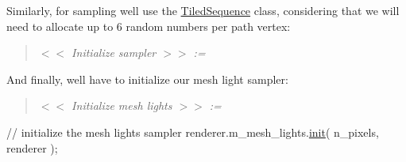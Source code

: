 \begin{DoxyParagraph}{}
Similarly, for sampling we\textquotesingle{}ll use the \hyperlink{struct_tiled_sequence}{Tiled\+Sequence} class, considering that we will need to allocate up to 6 random numbers per path vertex\+: ~\newline
\label{_hello_renderer_page_Initialize_sampler_anchor}%
%
 \begin{quote}
{\itshape  $<$$<$ Initialize sampler $>$$>$ \+:= }

\end{quote}


\end{DoxyParagraph}
\begin{DoxyParagraph}{}
And finally, we\textquotesingle{}ll have to initialize our mesh light sampler\+: ~\newline
\label{_hello_renderer_page_Initialize_mesh_lights_anchor}%
%
 \begin{quote}
{\itshape  $<$$<$ Initialize mesh lights $>$$>$ \+:= }

\end{quote}

\begin{DoxyCode}
\textcolor{comment}{// initialize the mesh lights sampler}
renderer.m\_mesh\_lights.\hyperlink{struct_rendering_context_a5ca766a70c2def1699f2ed6fa1f8bccd}{init}( n\_pixels, renderer );
\end{DoxyCode}

\end{DoxyParagraph}
